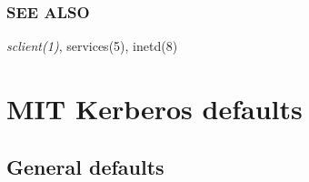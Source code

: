 \documentclass[letterpaper,10pt,english]{sphinxmanual}
\begin{document}
\subsection{SEE ALSO}
\label{admin/admin_commands/sserver:see-also}
\emph{sclient(1)}, services(5), inetd(8)


\chapter{MIT Kerberos defaults}
\label{mitK5defaults:mitk5defaults}\label{mitK5defaults::doc}\label{mitK5defaults:mit-kerberos-defaults}

\section{General defaults}
\label{mitK5defaults:general-defaults}
\end{document}
